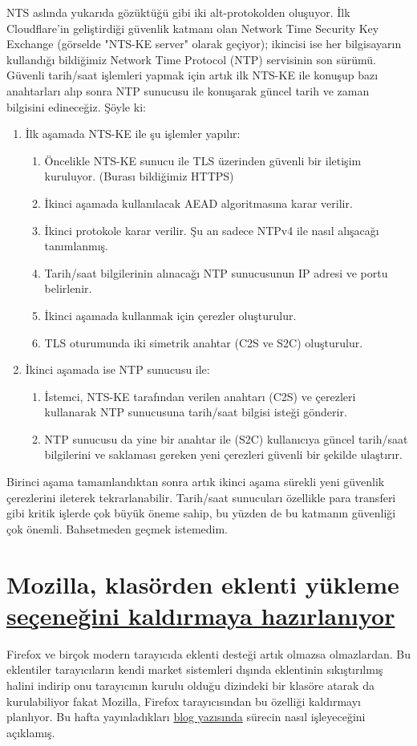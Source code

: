 \documentclass[11pt]{article}
\begin{document}
NTS aslında yukarıda gözüktüğü gibi iki alt-protokolden oluşuyor. İlk
Cloudflare'in geliştirdiği güvenlik katmanı olan Network Time Security Key
Exchange (görselde "NTS-KE server" olarak geçiyor); ikincisi ise her
bilgisayarın kullandığı bildiğimiz Network Time Protocol (NTP) servisinin son
sürümü. Güvenli tarih/saat işlemleri yapmak için artık ilk NTS-KE ile konuşup
bazı anahtarları alıp sonra NTP sunucusu ile konuşarak güncel tarih ve zaman
bilgisini edineceğiz. Şöyle ki:
\begin{enumerate}
\item İlk aşamada NTS-KE ile şu işlemler yapılır:
\begin{enumerate}
\item Öncelikle NTS-KE sunucu ile TLS üzerinden güvenli bir iletişim kuruluyor.
(Burası bildiğimiz HTTPS)
\item İkinci aşamada kullanılacak AEAD algoritmasına karar verilir.
\item İkinci protokole karar verilir. Şu an sadece NTPv4 ile nasıl alışacağı
tanımlanmış.
\item Tarih/saat bilgilerinin alınacağı NTP sunucusunun IP adresi ve portu
belirlenir.
\item İkinci aşamada kullanmak için çerezler oluşturulur.
\item TLS oturumunda iki simetrik anahtar (C2S ve S2C) oluşturulur.
\end{enumerate}
\item İkinci aşamada ise NTP sunucusu ile:
\begin{enumerate}
\item İstemci, NTS-KE tarafından verilen anahtarı (C2S) ve çerezleri
kullanarak NTP sunucusuna tarih/saat bilgisi isteği gönderir.
\item NTP sunucusu da yine bir anahtar ile (S2C) kullanıcıya güncel
tarih/saat bilgilerini ve saklaması gereken yeni çerezleri güvenli bir
şekilde ulaştırır.
\end{enumerate}
\end{enumerate}
Birinci aşama tamamlandıktan sonra artık ikinci aşama sürekli yeni güvenlik
çerezlerini ileterek tekrarlanabilir. Tarih/saat sunucuları özellikle para
transferi gibi kritik işlerde çok büyük öneme sahip, bu yüzden de bu katmanın
güvenliği çok önemli. Bahsetmeden geçmek istemedim.
\section{Mozilla, klasörden eklenti yükleme \href{https://www.zdnet.com/article/mozilla-to-stop-supporting-sideloaded-extensions-in-firefox/}{seçeneğini kaldırmaya hazırlanıyor}}
\label{sec:org2db9bd4}
Firefox ve birçok modern tarayıcıda eklenti desteği artık olmazsa olmazlardan.
Bu eklentiler tarayıcıların kendi market sistemleri dışında eklentinin
sıkıştırılmış halini indirip onu tarayıcının kurulu olduğu dizindeki bir
klasöre atarak da kurulabiliyor fakat Mozilla, Firefox tarayıcısından bu
özelliği kaldırmayı planlıyor. Bu hafta yayınladıkları \href{https://blog.mozilla.org/addons/2019/10/31/firefox-to-discontinue-sideloaded-extensions/}{blog yazısında} sürecin
nasıl işleyeceğini açıklamış.
\end{document}
